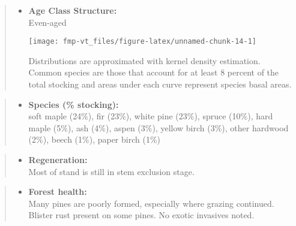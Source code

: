 \documentclass[]{tufte-handout}
\providecommand{\tightlist}{%
  \setlength{\itemsep}{0pt}\setlength{\parskip}{0pt}}
\begin{document}
\begin{quote}
\begin{itemize}
\tightlist
\item
  \textbf{Age Class Structure:}\\
  \vspace{2pt} Even-aged\\

  \begin{marginfigure}
  \texttt{[image: fmp-vt\_files/figure-latex/unnamed-chunk-14-1]} \caption[Distributions are approximated with kernel density estimation]{Distributions are approximated with kernel density estimation. Common species are those that account for at least 8 percent of the total stocking and areas under each curve represent species basal areas.}\label{fig:unnamed-chunk-14}
  \end{marginfigure}
\end{itemize}
\end{quote}

\begin{quote}
\begin{itemize}
\tightlist
\item
  \textbf{Species (\% stocking):}\\
  \vspace{2pt} soft maple (24\%), fir (23\%), white pine (23\%), spruce
  (10\%), hard maple (5\%), ash (4\%), aspen (3\%), yellow birch (3\%),
  other hardwood (2\%), beech (1\%), paper birch (1\%)
\end{itemize}
\end{quote}

\begin{quote}
\begin{itemize}
\tightlist
\item
  \textbf{Regeneration:}\\
  \vspace{2pt} Most of stand is still in stem exclusion stage.
\end{itemize}
\end{quote}

\begin{quote}
\begin{itemize}
\tightlist
\item
  \textbf{Forest health:}\\
  \vspace{2pt} Many pines are poorly formed, especially where grazing
  continued. Blister rust present on some pines. No exotic invasives
  noted.
\end{itemize}
\end{quote}
\end{document}

